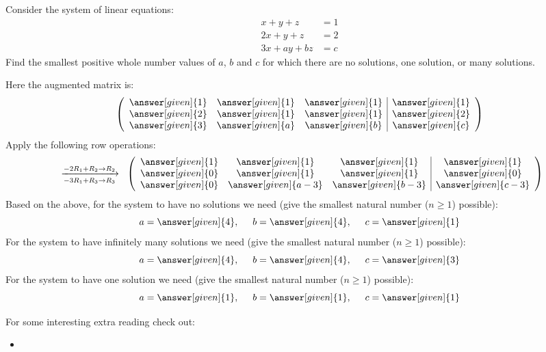 \documentclass{ximera}
\begin{document}
\begin{example}
  Consider the system of linear equations:
  \begin{align*}
    x+y+z &=  1\\
    2x+y+z &=  2\\
    3x+ay+bz &= c
  \end{align*}
  Find the smallest positive whole number values of $a$, $b$ and $c$
  for which there are no solutions, one solution, or many solutions.
  \begin{explanation}
    Here the augmented matrix is:
    \[\left(\begin{array}{ccc|c}
    \answer[given]{1} &  \answer[given]{1} &  \answer[given]{1} &  \answer[given]{1} \\
    \answer[given]{2} &  \answer[given]{1} &  \answer[given]{1} &  \answer[given]{2} \\
    \answer[given]{3} &  \answer[given]{a} &  \answer[given]{b} &  \answer[given]{c}
    \end{array}\right)\]
    Apply the following row operations:
    \[
    \hspace{.2cm} \xrightarrow[-3R_{1}+R_{3}\rightarrow R_{3}]
           {-2R_{1} + R_{2}\rightarrow R_{2}}\hspace{.2cm}
    \left(\begin{array}{ccc|c}
      \answer[given]{1} &  \answer[given]{1} &  \answer[given]{1} &  \answer[given]{1} \\
      \answer[given]{0} &  \answer[given]{1} &  \answer[given]{1} &  \answer[given]{0} \\
      \answer[given]{0} &  \answer[given]{a-3} &  \answer[given]{b-3} &  \answer[given]{c-3}
    \end{array}\right)\]
    Based on the above, for the system to have no solutions we need (give the smallest natural number ($n\geq 1$) possible):
    \[
    a = \answer[given]{4}, \hspace{.5cm} b = \answer[given]{4}, \hspace{.5cm} c = \answer[given]{1}
    \]
    For the system to have infinitely many solutions we need (give the smallest natural number ($n\geq 1$) possible):
    \[
    a = \answer[given]{4}, \hspace{.5cm} b = \answer[given]{4}, \hspace{.5cm} c = \answer[given]{3}
    \]
    For the system to have one solution we need (give the smallest natural number ($n\geq 1$) possible):
    \[
    a = \answer[given]{1}, \hspace{.5cm} b = \answer[given]{1}, \hspace{.5cm} c = \answer[given]{1}
    \]
  \end{explanation}
\end{example}


For some interesting extra reading check out:
\begin{itemize}
\item {}
\end{itemize}
\end{document}
